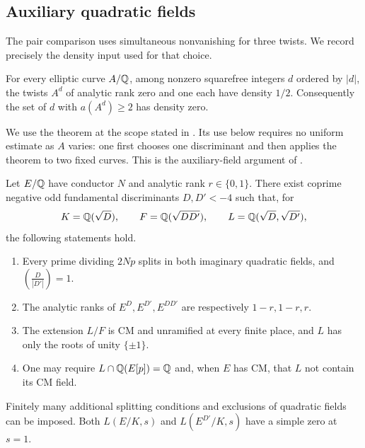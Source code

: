 \subsection{Auxiliary quadratic fields}

The pair comparison uses simultaneous nonvanishing for three twists.
We record precisely the density input used for that choice.

\begin{theorem}\label{classical:twist-density}
For every elliptic curve $A/\mathbb Q$, among nonzero squarefree integers
$d$ ordered by $|d|$, the twists $A^d$ of analytic rank zero and one
each have density $1/2$. Consequently the set of $d$ with
$a(A^d)\geq2$ has density zero.
\end{theorem}

We use the theorem at the scope stated in \cite[Theorem~1.2]{Goldfeld}.
Its use below requires no uniform estimate as $A$ varies: one first
chooses one discriminant and then applies the theorem to two fixed
curves. This is the auxiliary-field argument of \cite[Section~2]{C}.

\begin{lemma}\label{classical:auxiliary-fields}
Let $E/\mathbb Q$ have conductor $N$ and analytic rank $r\in\{0,1\}$.
There exist coprime negative odd fundamental discriminants $D,D'<-4$
such that, for
\[
 K=\mathbb Q(\sqrt D),\qquad F=\mathbb Q(\sqrt{DD'}),\qquad
 L=\mathbb Q(\sqrt D,\sqrt{D'}),
\]
the following statements hold.
\begin{enumerate}[label=\textup{(\roman*)}]
\item Every prime dividing $2Np$ splits in both imaginary quadratic
fields, and $\left(\frac{D}{|D'|}\right)=1$.
\item The analytic ranks of $E^D,E^{D'},E^{DD'}$ are respectively
$1-r,1-r,r$.
\item The extension $L/F$ is CM and unramified at every finite place,
and $L$ has only the roots of unity $\{\pm1\}$.
\item One may require $L\cap\mathbb Q(E[p])=\mathbb Q$ and, when $E$ has CM,
that $L$ not contain its CM field.
\end{enumerate}
Finitely many additional splitting conditions and exclusions of
quadratic fields can be imposed. Both $L(E/K,s)$ and
$L(E^{D'}/K,s)$ have a simple zero at $s=1$.
\end{lemma}

